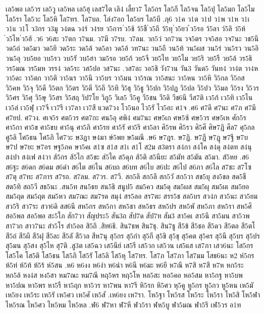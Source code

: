 {{เล5พอ
เล5วร
เล5วู
เล5หล
เล5ฮุ
เลส7ไต
เลิ4
เลี้ยว7
โล5กร
โล5กี
โล5จน
โล5ปุ
โล5มก
โล5ไม
โล5รา
โล5วะ
โล5หิ
โล7ทร.
โล7บล.
โล่ง7อก
ไล5บร
ไล5บี
.ฦ6
ว1ค
ว1ต
ว1ป
ว1พ
ว1ห
ว1เ
ว1แ
ว1โ
ว3กร
ว3มู
ว4ตฉ
ว4ร์
ว4รย
ว5การ
่ว5ช้
ว้5ชื
่ว5ถึ
ว้5ทุ
่ว5ยว
้ว5รอ
ว้5ลา
ว์5ลิ
ว่5ห้
่ว5ไห
่ว5ฮ้
.ว6
ว6สะ
ว7ตก
ว7นม.
ว7มี
ว7รบ.
ว7ลม.
วก5ว่
วก7วน
วจ5ตร
วจ5สอ
วจ7นะ
วช5นี
วด5ถ่
วด5มว
วด5ยิ
วด5ระ
วด5ล้
วด5ลา
วด5อ้
วท7นะ
วน5ถี
วน5ท้
วน5ผส
วน5ร่
วน5รว
วน5อิ
วน5อุ
วบ5ยอ
วบ5รว
วบ5รั
วบ5ฮา
วม5รอ
วย5ก้
วย5จี
วย5ไท
วย5ไม
วย5ริ
วย5รื
วย5ล้
วร5ธิ
วร5มณ
วร5มห
วรร4
วล5ระ
วส5ปอ
วส7นะ
.วส7ละ
วอ5ชิ
วัง7วน
วัน3
วันต5
วันท4
วา4ต
วา4ห
วา5ดะ
วา5ตก
วา5ติ
วา5นร
วา5นึ
วา5บร
วา5มน
วา5รณ
วา5สนะ
วา5หน
วา5หิ
วิ5กล
วิ5กส
วิ5คห
วิ5จุ
วิ5ดี
วิ5ตก
วิ5ตร
วิ5ตี
วิ5ถี
วิ5ทิ
วิ5ธุ
วิ5ธู
วิ5ปก
วิ5ปฏ
วิ5ปล
วิ5ปว
วิ5มล
วิ5รง
วิ5วร
วิ5ศร
วิ5ศุ
วิ5ษุ
วิ5สร
วิ5สฤ
วิป7โย
วิภู5
วิเล5
วี5คู
วี5ชน
วี5ดิ
วีช6นี
วีส7ติ
เว5ก้
เว5ทิ
เว5ไน
เว5ล่
เว5ฬุ
เว7จี
เว7รี
เว7ลา
เว7สี
แวด7วง
โว5นอ
ไว5รั
ไว5อะ
ศ1จ
.ศ6
ศ7ดี
ศ7นะ
ศ7ภ
ศ7มี
ศ7ยป.
ศ7วง.
ศเจ5ร
ศต5วร
ศต7กะ
ศน5อุ
ศพิ4
ศม7นะ
ศษ5เก
ศษ5ซ้
ศษ5วร
ศษ5เห
ศัก5ร
ศา5กา
ศา5ข
ศา5ขบ
ศา5นุ
ศา5ภิ
ศา5รย
ศา5รั
ศา5ริ
ศา5ลา
ศิ5รพ
ศิ5รว
ศิ5ศี
ศิษ7ฎิ
ศีล7
ศุ5กล
ศู5ลิ
โศ5ธน
โศ5ภิ
ไศ7วะ
ษ3ฎา
ษ4มา
ษ์5พย
ษ5มณี
.ษ6
ษ7ฎร.
ษ7ฏิ.
ษ7ฏี
ษ7ฏุ
ษ7ฐี
ษ7บ
ษ7ป
ษ7ยะ
ษ7อร
ษฐ5ภค
ษา5คเ
ส1ซ
ส1ส
ส1เ
ส1โ
ส2ม
ส3ตรา
ส4กา
ส4โค
ส4ดุ
ส4ตท
ส4นุ
ส4ปา
ส4เฟ
ส4วา
ส้5กร
ส้5ไก
ส5ขะ
ส่5ไค
ส5ดุภ
ส้5ติ
ส5นียะ
ส5มัท
ส5มัน
ส5มา.
ส์5หย
.ส6
ส6ฐะ
ส6ดก
ส6ดม
ส6ดำ
ส6ไต
ส6ไน
ส6บถ
ส6บท
ส6ไบ
ส6ปะ
ส6ไป
ส6ภา
ส6ไล
ส7ชะ
ส7โซ
ส7ตุ
ส7ทะ
ส7ภาร
ส7รถ.
ส7ลม.
ส7วร.
ส7วี.
สก5ลิ
สก5ลึ
สก5วั
สก5วา
สข5บุ
สง5ขล
สด5ชื
สต5ทิ
สถ5วี
สธ5นะ
.สน5ท
สน5ธย
สน5ธิ
สนูป5
สม5คว
สม5ดุ
สม5ผส
สม5ผุ
สม5ผเ
สม5ยอ
สม5ฤด
สม5ฤต
สม5หว
สม7ณะ
สม7รด
สมุ4
สร5ลอ
สร7ตะ
สรร5ช
สล5บร
สว4ก
สว5นะ
สว5ยม
สว5ริ
สว7ระ
สวา6ดิ
สส6นี
สห5กร
สห5กา
สห5ชา
สห5ธร
สห5ปร
สห5พั
สห5ภา
สห5รา
สห5ศึ
สอ5พล
สอ5พอ
สะ5ใภ
สัก7วา
สัญประ5
สัน3ถ
สัป7ด
สัป7ท
สัม3
สา5คเ
สา5นึ
สา5มน
สา5วพ
สา7วก
สาว7นะ
สำ5โร
สำ5ออ
สิ5ถิ
.สิท6ธิ.
สิน7ธพ
สิน7ธุ.
สิน7ธู
สี5ข้
สี5ชอ
สี5ดว
สี5ตล
สี5ตโ
สี5ถ่
สี5ผึ
สี5ฝุ
สี5ละ
สี5ลั
สี5วล
สีห7นุ
สุ5กร
สุ5กำ
สุ5กี
สุ5ขิ
สุ5ขุ
สุ5คต
สุ5คร
สุ5นี
สุ5บร
สุ5ปร
สุ5มน
สุ5สง
สุ5ไห
สุ7ติ
.สู3ต
เส5ฉว
เส5นีย์
เส5รี
เส5วก
เส5วน
เส5แส
เส7ภา
เสว6นะ
โส5กร
โส5โค
โส5ติ
โส5ธน
โส5ภิ
โส5รั
โส5ลิ
โส5หุ
โส7ทร.
โส7ภ
โส7ภา
โส7มม
โสธ6นะ
ห2
ห์5กร
ห้5ท่
ห้5ท้
ห้5ร้
ห์5สน
.ห6
ห6งง
ห6งำ
ห6นำ
ห6นี
ห6มะ
ห6ยี
ห7ณี
ห7สิ
ห7สี
ห7ห
หก5ระ
หก5ล้
หง4ส
หง5สา
หม7ณะ
หม7ณี
หฤ5หร
หฤ5โห
หล5สะ
หอ5คอ
หอ5สม
หา5กฐ
หา5บพ
หา5ปณ
หา5พร
หา5รื
หา5ฤก
หา5วร
หา7พน
หา7รี
หิ5รก
หิ5ศว
หุ5คู
หู5กร
หู5กว
หู5หน
เห5มั
เห5ยง
เห5ระ
เห5รั
เห5ศว
เห5ศั
เห5สั
.เห6ยง
เห7รา.
โห5ฐา
โห5รส
โห5ระ
โห5รา
โห5สิ
โห5ฬา
ไห5รณ
ไห5ศว
ไห5หม
ไห5หล
.ฬ6
ฬ7หา
ฬ7หี
ฬว5รา
ฬห5บู
ฬา5มณ
ฬา5รึ
เฬ5วร
อ1ท
}}

